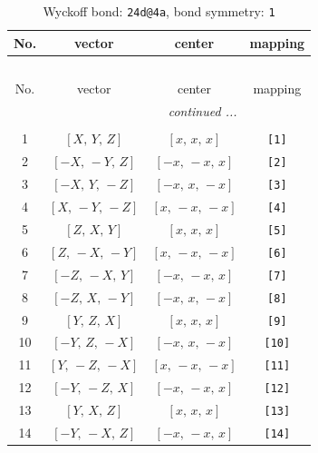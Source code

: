 \documentclass[fleqn,8pt]{jsarticle}
\begin{document}
\begin{longtable}{cccc}
\caption{Wyckoff bond: {\tt 24d@4a}, bond symmetry: {\tt 1}}
 \\
 \hline \hline
No. & vector & center & mapping \\ \hline \endfirsthead

\multicolumn{3}{l}{\tablename\ \thetable{}} \\
 \hline \hline
No. & vector & center & mapping \\ \hline \endhead

 \hline \hline
\multicolumn{3}{r}{\footnotesize\it continued ...} \\ \endfoot

 \hline \hline
\multicolumn{3}{r}{} \\ \endlastfoot

1 & $\left[ X,\, Y,\, Z \right]$ & $\left[ x,\, x,\, x \right]$ & {\tt [1]} \\ \hline
2 & $\left[ - X,\, - Y,\, Z \right]$ & $\left[ - x,\, - x,\, x \right]$ & {\tt [2]} \\ \hline
3 & $\left[ - X,\, Y,\, - Z \right]$ & $\left[ - x,\, x,\, - x \right]$ & {\tt [3]} \\ \hline
4 & $\left[ X,\, - Y,\, - Z \right]$ & $\left[ x,\, - x,\, - x \right]$ & {\tt [4]} \\ \hline
5 & $\left[ Z,\, X,\, Y \right]$ & $\left[ x,\, x,\, x \right]$ & {\tt [5]} \\ \hline
6 & $\left[ Z,\, - X,\, - Y \right]$ & $\left[ x,\, - x,\, - x \right]$ & {\tt [6]} \\ \hline
7 & $\left[ - Z,\, - X,\, Y \right]$ & $\left[ - x,\, - x,\, x \right]$ & {\tt [7]} \\ \hline
8 & $\left[ - Z,\, X,\, - Y \right]$ & $\left[ - x,\, x,\, - x \right]$ & {\tt [8]} \\ \hline
9 & $\left[ Y,\, Z,\, X \right]$ & $\left[ x,\, x,\, x \right]$ & {\tt [9]} \\ \hline
10 & $\left[ - Y,\, Z,\, - X \right]$ & $\left[ - x,\, x,\, - x \right]$ & {\tt [10]} \\ \hline
11 & $\left[ Y,\, - Z,\, - X \right]$ & $\left[ x,\, - x,\, - x \right]$ & {\tt [11]} \\ \hline
12 & $\left[ - Y,\, - Z,\, X \right]$ & $\left[ - x,\, - x,\, x \right]$ & {\tt [12]} \\ \hline
13 & $\left[ Y,\, X,\, Z \right]$ & $\left[ x,\, x,\, x \right]$ & {\tt [13]} \\ \hline
14 & $\left[ - Y,\, - X,\, Z \right]$ & $\left[ - x,\, - x,\, x \right]$ & {\tt [14]} \\ \hline

\end{longtable}
\end{document}
